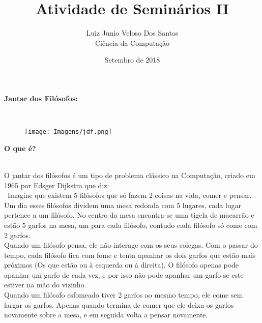 \documentclass[a4paper, article]{article}
\begin{document}
 
    \title{\vspace{-3cm}Atividade de Seminários II}
    \author{Luiz Junio Veloso Dos Santos\\ Ciência da Computação}
    \date{Setembro de 2018}
    \maketitle

    \begin{enumerate}
        {\large \item \textbf{Jantar dos Filósofos:}}\\
            \begin{figure}[h]
                \centering
                \texttt{[image: Imagens/jdf.png]}
            \end{figure}
            \begin{enumerate}
                {\large \item \textbf{O que é?}}\\
                O jantar dos filósofos é um tipo de problema clássico na Computação, criado
                em 1965 por Edsger Dijkstra que diz:\\
                \
                Imagine que existem 5 filósofos que só fazem 2 coisas na vida, comer e pensar.
                Um dia esses filósofos dividem uma mesa redonda com 5 lugares, cada lugar pertence
                a um filósofo. No centro da mesa encontra-se uma tigela de macarrão e 
                estão 5 garfos na mesa, um para cada filósofo, contudo cada filósofo só come com 2
                garfos.\\
                Quando um filósofo pensa, ele não interage com os seus colegas. Com o passar do tempo,
                cada filósofo fica com fome e tenta apanhar os dois garfos que estão mais próximos
                (Os que estão ou à esquerda ou à direita). O filósofo apenas pode apanhar um garfo
                de cada vez, e por isso não pode apanhar um garfo se este estiver na mão do vizinho.\\
                Quando um filósofo esfomeado tiver 2 garfos ao mesmo tempo, ele come sem largar os garfos.
                Apenas quando termina de comer que ele deixa os garfos novamente sobre a mesa, e em seguida
                volta a pensar novamente.\\ 


\end{enumerate}
\end{enumerate}
\end{document}
